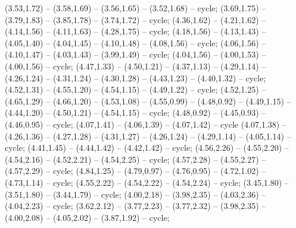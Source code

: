 { (3.53,1.72) -- (3.58,1.69) -- (3.56,1.65) -- (3.52,1.68) -- cycle;
 (3.69,1.75) -- (3.79,1.83) -- (3.85,1.78) -- (3.74,1.72) -- cycle;
 (4.36,1.62) -- (4.21,1.62) -- (4.14,1.56) -- (4.11,1.63) -- (4.28,1.75) -- cycle;
 (4.18,1.56) -- (4.13,1.43) -- (4.05,1.40) -- (4.04,1.45) -- (4.10,1.48) -- (4.08,1.56) -- cycle;
 (4.06,1.56) -- (4.10,1.47) -- (4.03,1.43) -- (3.99,1.49) -- cycle;
 (4.04,1.56) -- (4.00,1.53) -- (4.00,1.56) -- cycle;
 (4.47,1.33) -- (4.50,1.21) -- (4.37,1.13) -- (4.29,1.14) -- (4.26,1.24) -- (4.31,1.24) -- (4.30,1.28) -- (4.43,1.23) -- (4.40,1.32) -- cycle;
 (4.52,1.31) -- (4.55,1.20) -- (4.54,1.15) -- (4.49,1.22) -- cycle;
 (4.52,1.25) -- (4.65,1.29) -- (4.66,1.20) -- (4.53,1.08) -- (4.55,0.99) -- (4.48,0.92) -- (4.49,1.15) -- (4.44,1.20) -- (4.50,1.21) -- (4.54,1.15) -- cycle;
 (4.48,0.92) -- (4.45,0.93) -- (4.46,0.95) -- cycle;
 (4.07,1.41) -- (4.06,1.39) -- (4.07,1.42) -- cycle (4.07,1.38) -- (4.26,1.36) -- (4.27,1.28) -- (4.31,1.27) -- (4.26,1.24) -- (4.29,1.14) -- (4.05,1.14) -- cycle;
 (4.41,1.45) -- (4.44,1.42) -- (4.42,1.42) -- cycle;
 (4.56,2.26) -- (4.55,2.20) -- (4.54,2.16) -- (4.52,2.21) -- (4.54,2.25) -- cycle;
 (4.57,2.28) -- (4.55,2.27) -- (4.57,2.29) -- cycle;
 (4.84,1.25) -- (4.79,0.97) -- (4.76,0.95) -- (4.72,1.02) -- (4.73,1.14) -- cycle;
 (4.55,2.22) -- (4.54,2.22) -- (4.54,2.24) -- cycle;
 (3.45,1.80) -- (3.51,1.80) -- (3.44,1.79) -- cycle;
 (4.00,2.18) -- (3.98,2.35) -- (4.03,2.36) -- (4.04,2.23) -- cycle;
 (3.62,2.12) -- (3.77,2.23) -- (3.77,2.32) -- (3.98,2.35) -- (4.00,2.08) -- (4.05,2.02) -- (3.87,1.92) -- cycle;
}
